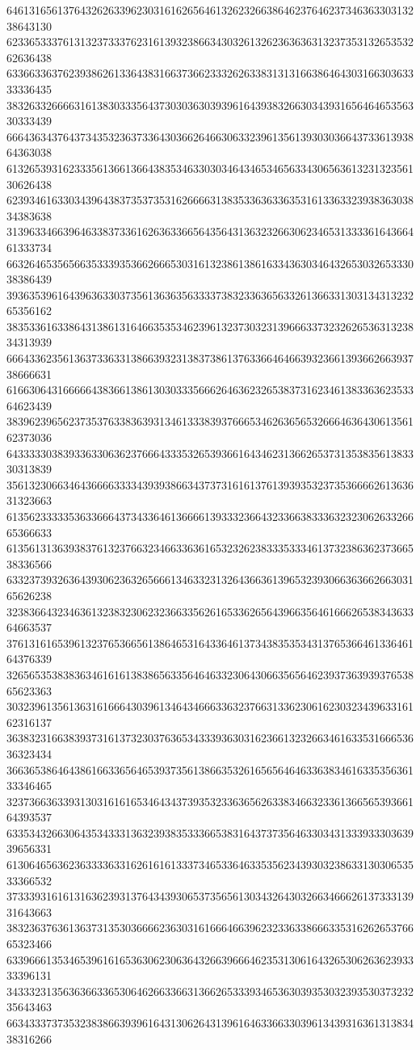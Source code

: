 64613165613764326263396230316162656461326232663864623764623734636330313238643130
62336533376131323733376231613932386634303261326236363631323735313265353262636438
63366336376239386261336438316637366233326263383131316638646430316630363333336435
38326332666631613830333564373030363039396164393832663034393165646465356330333439
66643634376437343532363733643036626466306332396135613930303664373361393864363038
61326539316233356136613664383534633030346434653465633430656361323132356130626438
62393461633034396438373537353162666631383533636336353161336332393836303834383638
31396334663964633837336162636336656435643136323266306234653133336164366461333734
66326465356566353339353662666530316132386138616334363034643265303265333038386439
39363539616439636330373561363635633337383233636563326136633130313431323265356162
38353361633864313861316466353534623961323730323139666337323262653631323834313939
66643362356136373363313866393231383738613763366464663932366139366266393738666631
61663064316666643836613861303033356662646362326538373162346138336362353364623439
38396239656237353763383639313461333839376665346263656532666463643061356162373036
64333330383933633063623766643335326539366164346231366265373135383561383330313839
35613230663464366663333439393866343737316161376139393532373536666261363631323663
61356233333536336664373433646136666139333236643233663833363232306263326665366633
61356131363938376132376632346633636165323262383335333461373238636237366538336566
63323739326364393062363265666134633231326436636139653239306636366266303165626238
32383664323463613238323062323663356261653362656439663564616662653834363364663537
37613161653961323765366561386465316433646137343835353431376536646133646164376339
32656535383836346161613838656335646463323064306635656462393736393937653865623363
30323961356136316166643039613464346663363237663133623061623032343963316162316137
36383231663839373161373230376365343339363031623661323266346163353166653636323434
36636538646438616633656465393735613866353261656564646336383461633535636133346465
32373663633931303161616534643437393532336365626338346632336136656539366164393537
63353432663064353433313632393835333665383164373735646330343133393330363939656331
61306465636236333363316261616133373465336463353562343930323863313030653533366532
37333931616131636239313764343930653735656130343264303266346662613733313931643663
38323637636136373135303666623630316166646639623233633866633531626265376665323466
63396661353465396161653630623063643266396664623531306164326530626362393333396131
34333231356363663365306462663366313662653339346536303935303239353037323235643463
66343337373532383866393961643130626431396164633663303961343931636131383438316266
